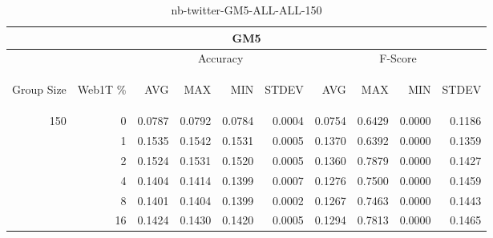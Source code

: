 \begin{center}
\begin{table}[htbp]
\begin{center}
\begin{tabular}{ | r | r | r | r | r | r | r | r | r | r |}
\hline
\multicolumn{10}{|c|}{GM5}\\
\hline
 & & \multicolumn{4}{|c|}{Accuracy} & \multicolumn{4}{|c|}{F-Score}\\ \cline{3-10}
\begin{sideways}Group Size\end{sideways} & \begin{sideways}Web1T \%\end{sideways} & \begin{sideways}AVG\end{sideways} & \begin{sideways}MAX\end{sideways} & \begin{sideways}MIN\end{sideways} & \begin{sideways}STDEV\end{sideways} & \begin{sideways}AVG\end{sideways} & \begin{sideways}MAX\end{sideways} & \begin{sideways}MIN\end{sideways} & \begin{sideways}STDEV\end{sideways}\\
\hline
\multirow{5}{*}{150}
 & 0 & 0.0787 & 0.0792 & 0.0784 & 0.0004 & 0.0754 & 0.6429 & 0.0000 & 0.1186\\ \cline{2-10}
 & 1 & 0.1535 & 0.1542 & 0.1531 & 0.0005 & 0.1370 & 0.6392 & 0.0000 & 0.1359\\ \cline{2-10}
 & 2 & 0.1524 & 0.1531 & 0.1520 & 0.0005 & 0.1360 & 0.7879 & 0.0000 & 0.1427\\ \cline{2-10}
 & 4 & 0.1404 & 0.1414 & 0.1399 & 0.0007 & 0.1276 & 0.7500 & 0.0000 & 0.1459\\ \cline{2-10}
 & 8 & 0.1401 & 0.1404 & 0.1399 & 0.0002 & 0.1267 & 0.7463 & 0.0000 & 0.1443\\ \cline{2-10}
 & 16 & 0.1424 & 0.1430 & 0.1420 & 0.0005 & 0.1294 & 0.7813 & 0.0000 & 0.1465\\ \cline{2-10}
\hline
\end{tabular}
\caption{nb-twitter-GM5-ALL-ALL-150}
\label{table:nb-twitter-GM5-ALL-ALL-150}
\end{center}
\end{table}
\end{center}

